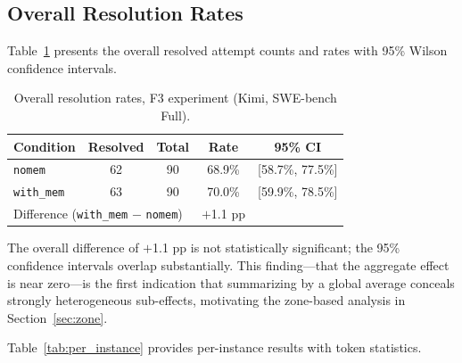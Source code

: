 \documentclass{article}
\begin{document}
\subsection{Overall Resolution Rates}

Table~\ref{tab:overall} presents the overall resolved attempt counts and rates with 95\% Wilson confidence intervals.

\begin{table}[h]
\centering
\caption{Overall resolution rates, F3 experiment (Kimi, SWE-bench Full).}
\label{tab:overall}
\begin{tabular}{lcccc}
\toprule
\textbf{Condition} & \textbf{Resolved} & \textbf{Total} & \textbf{Rate} & \textbf{95\% CI} \\
\midrule
\texttt{nomem} & 62 & 90 & 68.9\% & [58.7\%, 77.5\%] \\
\texttt{with\_mem} & 63 & 90 & 70.0\% & [59.9\%, 78.5\%] \\
\midrule
\multicolumn{3}{l}{Difference (\texttt{with\_mem} $-$ \texttt{nomem})} & $+$1.1 pp & \\
\bottomrule
\end{tabular}
\end{table}

The overall difference of $+$1.1 pp is not statistically significant; the 95\% confidence intervals overlap substantially. This finding---that the aggregate effect is near zero---is the first indication that summarizing by a global average conceals strongly heterogeneous sub-effects, motivating the zone-based analysis in Section~\ref{sec:zone}.

Table~\ref{tab:per_instance} provides per-instance results with token statistics.
\end{document}
